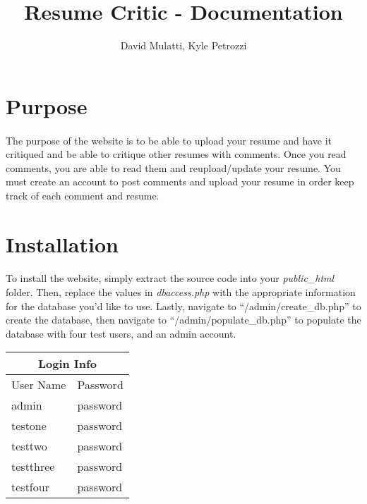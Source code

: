 \documentclass[11pt,letterpaper,titlepage]{article}
\title{Resume Critic - Documentation}
\author{David Mulatti, Kyle Petrozzi}
\date{}
\begin{document}
    \maketitle
    \section{Purpose}
    \paragraph{}
    The purpose of the website is to be able to upload your resume and have it
    critiqued and be able to critique other resumes with comments. Once you read
    comments, you are able to read them and reupload/update your resume. You
    must create an account to post comments and upload your resume in order keep
    track of each comment and resume.

    \section{Installation}
    \paragraph{}
    To install the website, simply extract the source code into your
    \emph{public\_html} folder. Then, replace the values in \emph{dbaccess.php}
    with the appropriate information for the database you'd like to use.
    Lastly, navigate to ``/admin/create\_db.php'' to create the database, then
    navigate to ``/admin/populate\_db.php'' to populate the database with four
    test users, and an admin account.

    \begin{center}
        \begin{tabular}{ | l | l | }
            \multicolumn{2}{c}{Login Info} \\
            \hline
            User Name & Password \\ \hline
            admin & password \\ \hline
            testone & password \\ \hline
            testtwo & password \\ \hline
            testthree & password \\ \hline
            testfour & password \\
            \hline
        \end{tabular}
    \end{center}
\end{document}
